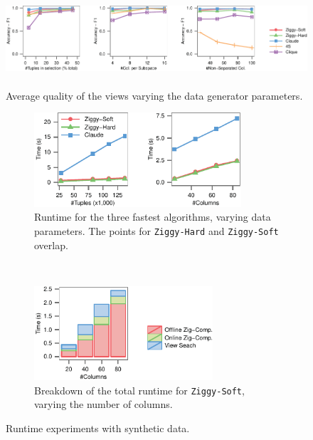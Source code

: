 \begin{figure}[t!]
  \centering
  \includegraphics[height=3.5cm]{Plots/Synth-Accuracy}
  \caption{Average quality of the views varying the data generator parameters.}
  \label{pic:synthquali}
\end{figure}
\begin{figure}[t!]
    \centering
    \begin{subfigure}[b]{0.5\textwidth}
        \centering
    \includegraphics[height=3.5cm]{Plots/Synth-Runtime}
    \caption{Runtime for the three fastest algorithms, varying data parameters.
    The points for \texttt{Ziggy-Hard} and \texttt{Ziggy-Soft} overlap.}
    \label{pic:genruntime}
    \end{subfigure}
    ~~
    \begin{subfigure}[b]{0.45\textwidth}
        \centering
        \includegraphics[height=3.5cm]{Plots/Synth-TimeDetail}
        \caption{Breakdown of the total runtime for \texttt{Ziggy-Soft},
        varying the number of columns.}
    \label{pic:detruntime}
    \end{subfigure}
  \label{pic:syntruntime}
    \caption{Runtime experiments with synthetic data.}
\end{figure}

